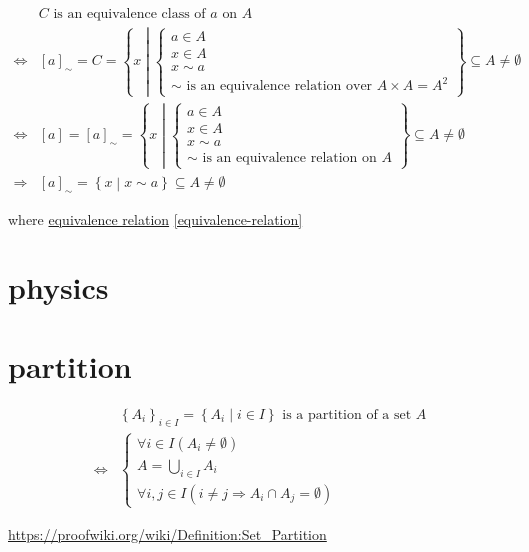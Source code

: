\documentclass[
]{book}
\theoremstyle{definition}
\theoremstyle{definition}
\theoremstyle{definition}
\theoremstyle{definition}
\theoremstyle{remark}
\begin{document}
\begin{align*}
 & C\text{ is an equivalence class of }a\text{ on }A\\
\Leftrightarrow & \left[a\right]_{\sim}=C=\left\{ x\middle|\begin{cases}
a\in A\\
x\in A\\
x\sim a\\
\sim\text{ is an equivalence relation over }A\times A=A^{2}
\end{cases}\right\} \subseteq A\ne\emptyset\\
\Leftrightarrow & \left[a\right]=\left[a\right]_{\sim}=\left\{ x\middle|\begin{cases}
a\in A\\
x\in A\\
x\sim a\\
\sim\text{ is an equivalence relation on }A
\end{cases}\right\} \subseteq A\ne\emptyset\\
\Rightarrow & \left[a\right]_{\sim}=\left\{ x\middle|x\sim a\right\} \subseteq A\ne\emptyset
\end{align*}

where \protect\hyperlink{equivalence-relation}{equivalence relation} \ref{equivalence-relation}

\hypertarget{physics}{%
\chapter{physics}\label{physics}}

\hypertarget{partition}{%
\chapter*{partition}\label{partition}}

\begin{align*}
 & \left\{ A_{i}\right\} _{i\in I}=\left\{ A_{i}\middle|i\in I\right\} \text{ is a partition of a set }A\\
\Leftrightarrow & \begin{cases}
\forall i\in I\left(A_{i}\ne\emptyset\right)\\
A=\bigcup\limits _{i\in I}A_{i}\\
\forall i,j\in I\left(i\ne j\Rightarrow A_{i}\cap A_{j}=\emptyset\right)
\end{cases}
\end{align*}

\url{https://proofwiki.org/wiki/Definition:Set_Partition}
\end{document}
